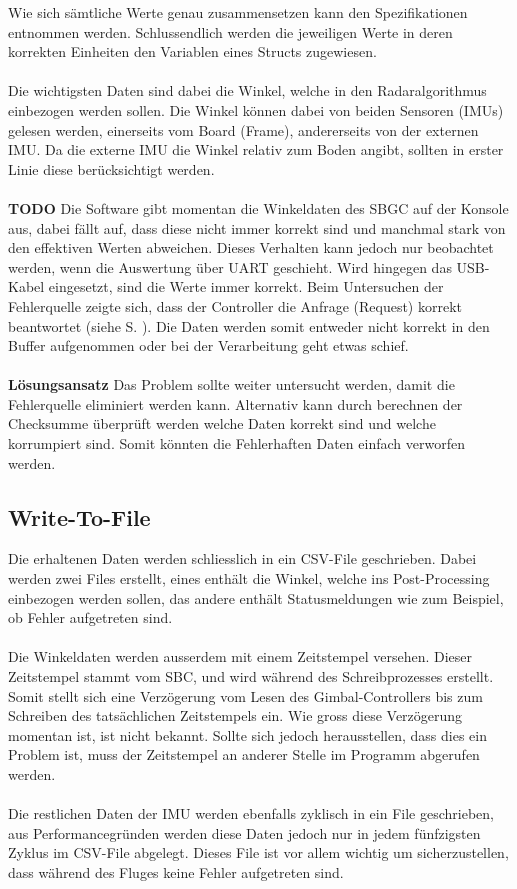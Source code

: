 \documentclass[12pt]{article} %
\begin{document}
	\noindent	
	Wie sich sämtliche Werte genau zusammensetzen kann den Spezifikationen entnommen werden. Schlussendlich werden die jeweiligen Werte in deren korrekten Einheiten den Variablen eines Structs zugewiesen.\\
	\\
	Die wichtigsten Daten sind dabei die Winkel, welche in den Radaralgorithmus einbezogen werden sollen. Die Winkel können dabei von beiden Sensoren (IMUs) gelesen werden, einerseits vom Board (Frame), andererseits von der externen IMU. Da die externe IMU die Winkel relativ zum Boden angibt, sollten in erster Linie diese berücksichtigt werden.\\
	\\
	\textbf{TODO} Die Software gibt momentan die Winkeldaten des SBGC auf der Konsole aus, dabei fällt auf, dass diese nicht immer korrekt sind und manchmal stark von den effektiven Werten abweichen. Dieses Verhalten kann jedoch nur beobachtet werden, wenn die Auswertung über UART geschieht. Wird hingegen das USB-Kabel eingesetzt, sind die Werte immer korrekt. Beim Untersuchen der Fehlerquelle zeigte sich, dass der Controller die Anfrage (Request) korrekt beantwortet (siehe S. \pageref{response}). Die Daten werden somit entweder nicht korrekt in den Buffer aufgenommen oder bei der Verarbeitung geht etwas schief.\\
	\\
	\textbf{Lösungsansatz}
	Das Problem sollte weiter untersucht werden, damit die Fehlerquelle eliminiert werden kann. Alternativ kann durch berechnen der Checksumme überprüft werden welche Daten korrekt sind und welche korrumpiert sind. Somit könnten die Fehlerhaften Daten einfach verworfen werden.
	
	\subsection{Write-To-File}
	Die erhaltenen Daten werden schliesslich in ein CSV-File geschrieben. Dabei werden zwei Files erstellt, eines enthält die Winkel, welche ins Post-Processing einbezogen werden sollen, das andere enthält Statusmeldungen wie zum Beispiel, ob Fehler aufgetreten sind.\\
	\\
	Die Winkeldaten werden ausserdem mit einem Zeitstempel versehen. Dieser Zeitstempel stammt vom SBC, und wird während des Schreibprozesses erstellt. Somit stellt sich eine Verzögerung vom Lesen des Gimbal-Controllers bis zum Schreiben des tatsächlichen Zeitstempels ein. Wie gross diese Verzögerung momentan ist, ist nicht bekannt. Sollte sich jedoch herausstellen, dass dies ein Problem ist, muss der Zeitstempel an anderer Stelle im Programm abgerufen werden.\\
	\\
	Die restlichen Daten der IMU werden ebenfalls zyklisch in ein File geschrieben, aus Performancegründen werden diese Daten jedoch nur in jedem fünfzigsten Zyklus im CSV-File abgelegt. Dieses File ist vor allem wichtig um sicherzustellen, dass während des Fluges keine Fehler aufgetreten sind.
	
\end{document}
